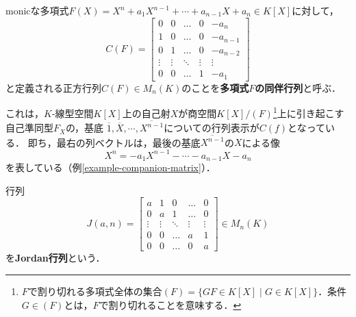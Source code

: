 \documentclass[uplatex, dvipdfmx]{jsreport}
\begin{document}
\begin{definition}
    monicな多項式$F(X) = X^n+a_1X^{n-1}+\cdots +a_{n-1}X+a_n \in K[X]$に対して，
        \[C(F)=\begin{bmatrix}
        0 & 0 & \dots & 0 & -a_n \\
        1 & 0 & \dots & 0 & -a_{n-1} \\
        0 & 1 & \dots & 0 & -a_{n-2} \\
        \vdots & \vdots & \ddots & \vdots & \vdots \\
        0 & 0 & \dots & 1 & -a_1
        \end{bmatrix}\]
    と定義される正方行列$C(F)\in M_n(K)$のことを\textbf{多項式$F$の同伴行列}と呼ぶ．
\end{definition}
\begin{remark}
    これは，$K$-線型空間$K[X]$上の自己射$X$が商空間$K[X]/(F)$\footnote{$F$で割り切れる多項式全体の集合$(F)=\{GF\in K[X]\mid G\in K[X]\}$．条件$G\in (F)$とは，$F$で割り切れることを意味する．}上に引き起こす自己準同型$F_X$の，基底
    $\overline{1},\overline{X},\cdots,\overline{X^{n-1}}$についての行列表示が$C(f)$となっている．
    即ち，最右の列ベクトルは，最後の基底$\overline{X^{n-1}}$の$X$による像
    \[ X^n=-a_1X^{n-1}-\cdots-a_{n-1}X-a_n \]
    を表している（例\ref{example-companion-matrix}）．
\end{remark}
\begin{definition}
        行列
        \[J(a,n)=\begin{bmatrix}
        a & 1 & 0 & \dots & 0 \\
        0 & a & 1 & \dots & 0 \\
        \vdots & \vdots & \ddots & \vdots & \vdots \\
        0 & 0 & \dots & a & 1 \\
        0 & 0 & \dots & 0 & a
        \end{bmatrix}\in M_n(K)\]
    を\textbf{Jordan行列}という．
\end{definition}
\end{document}
